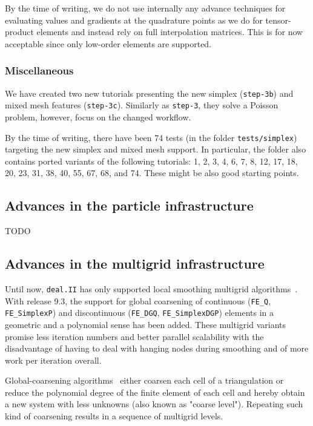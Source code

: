\documentclass{ansarticle-preprint}
\newcommand{\specialword}[1]{\texttt{#1}}
\newcommand{\dealii}{{\specialword{deal.II}}\xspace}
\begin{document}
By the time of writing, we do not use internally any advance techniques for evaluating values and 
gradients at the quadrature points as we do for tensor-product elements and 
instead rely on full interpolation matrices. This is for now acceptable since only low-order elements are 
supported. 

\subsubsection{Miscellaneous} 

We have created two new tutorials presenting the new simplex (\texttt{step-3b}) and mixed mesh features
(\texttt{step-3c}). Similarly as \texttt{step-3}, they solve a Poisson problem, however, focus
on the changed workflow.

By the time of writing, there have been 74 tests (in the folder \texttt{tests/simplex}) 
targeting the new simplex and mixed mesh support. In particular, the folder also
contains ported variants of the following tutorials: 1, 2, 3, 4, 6, 7, 8, 12, 17, 18, 20, 23, 31, 38,
40, 55, 67, 68, and 74. These might be also good starting points. 


\subsection{Advances in the particle infrastructure}
\label{subsec:particles}

TODO

\subsection{Advances in the multigrid infrastructure}
\label{subsec:mg}

Until now, \dealii has only supported local smoothing multigrid algorithms~\citep{ClevengerHeisterKanschatKronbichler2019}. With release 9.3, the support for global coarsening of continuous (\texttt{FE\_Q}, \texttt{FE\_SimplexP}) and discontinuous (\texttt{FE\_DGQ}, \texttt{FE\_SimplexDGP}) elements  in a geometric and a polynomial sense has been added. These multigrid variants promise less iteration numbers and better parallel scalability with the disadvantage of having to deal with hanging nodes during smoothing and of more work per iteration overall.

Global-coarsening algorithms~\citep{becker00} either coarsen each cell of a triangulation or reduce the polynomial degree of the finite element of each cell and hereby obtain a new system with less unknowns (also known as "coarse level"). 
Repeating such kind of coarsening results in a sequence of multigrid levels.
\end{document}
